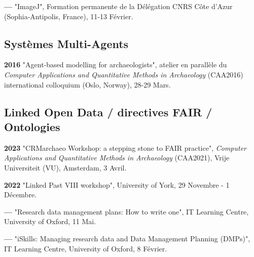 \documentclass{article}
\newcommand{\fr}[1]{#1}       %
\newcommand{\en}[1]{}     %
\begin{document}
\smallbreak
\textbf{--- }
\fr{"ImageJ", Formation permanente de la Délégation CNRS Côte d'Azur (Sophia-Antipolis, France), 11-13 Février.}
\en{"ImageJ", Permanent Training by the CNRS Côte d'Azur Delegation (Sophia-Antipolis, France), February 11-13.}

\smallbreak

\subsection*{\fr{Systèmes Multi-Agents}\en{Multi-Agent Systems}}

\textbf{2016 }
\fr{"Agent-based modelling for archaeologists", atelier en parallèle du \textit{Computer Applications and Quantitative Methods in Archaeology} (CAA2016) international colloquium (Oslo, Norway), 28-29 Mars.}
\en{"Agent-based Modelling for Archaeologists", parallel workshop at the \textit{Computer Applications and Quantitative Methods in Archaeology} (CAA2016) international colloquium (Oslo, Norway), March 28-29.}

\smallbreak

\subsection*{\fr{Linked Open Data / directives FAIR / Ontologies}\en{Linked Open Data / FAIR Guidelines / Ontologies}}

\textbf{2023 }
\fr{"CRMarchaeo Workshop: a stepping stone to FAIR practice", \textit{Computer Applications and Quantitative Methods in Archaeology} (CAA2021), Vrije Universiteit (VU), Amsterdam, 3 Avril.}
\en{"CRMarchaeo Workshop: A Stepping Stone to FAIR Practice", \textit{Computer Applications and Quantitative Methods in Archaeology} (CAA2021), Vrije Universiteit (VU), Amsterdam, April 3.}

\smallbreak
\textbf{2022 }
\fr{"Linked Past VIII workshop", University of York, 29 Novembre - 1 Décembre.}
\en{"Linked Past VIII Workshop", University of York, November 29 - December 1.}

\smallbreak
\textbf{--- }
\fr{"Research data management plans: How to write one", IT Learning Centre, University of Oxford, 11 Mai.}
\en{"Research Data Management Plans: How to Write One", IT Learning Centre, University of Oxford, May 11.}

\smallbreak
\textbf{--- }
\fr{"iSkills: Managing research data and Data Management Planning (DMPs)", IT Learning Centre, University of Oxford, 8 Février.}
\en{"iSkills: Managing Research Data and Data Management Planning (DMPs)", IT Learning Centre, University of Oxford, February 8.}
\end{document}
